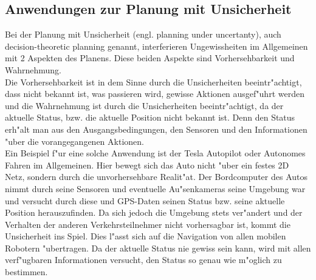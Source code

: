 \subsection{Anwendungen zur Planung mit Unsicherheit}
Bei der Planung mit Unsicherheit (engl. planning under uncertanty), auch decision-theoretic planning genannt, interferieren Ungewissheiten im Allgemeinen mit 2 Aspekten des Planens. Diese beiden Aspekte sind Vorhersehbarkeit und Wahrnehmung.\\
Die Vorhersehbarkeit ist in dem Sinne durch die Unsicherheiten beeintr"achtigt, dass nicht bekannt ist, was passieren wird, gewisse Aktionen ausgef"uhrt werden und die Wahrnehmung ist durch die Unsicherheiten beeintr"achtigt, da der aktuelle Status, bzw. die aktuelle Position nicht bekannt ist. Denn den Status erh"alt man aus den Ausgangsbedingungen, den Sensoren und den Informationen "uber die vorangegangenen Aktionen.\\
Ein Beispiel f"ur eine solche Anwendung ist der Tesla Autopilot oder Autonomes Fahren im Allgemeinen.%
 Hier bewegt sich das Auto nicht "uber ein festes 2D Netz, sondern durch die unvorhersehbare Realit"at. Der Bordcomputer des Autos nimmt durch seine Sensoren und eventuelle Au"senkameras seine Umgebung war und versucht durch diese und GPS-Daten seinen Status bzw. seine aktuelle Position herauszufinden. Da sich jedoch die Umgebung stets ver"andert und der Verhalten der anderen Verkehrsteilnehmer nicht vorhersagbar ist, kommt die Unsicherheit ins Spiel.
Dies l"asst sich auf die Navigation von allen mobilen Robotern "ubertragen.
Da der aktuelle Status nie gewiss sein kann, wird mit allen verf"ugbaren Informationen versucht, den Status so genau wie m"oglich zu bestimmen.
